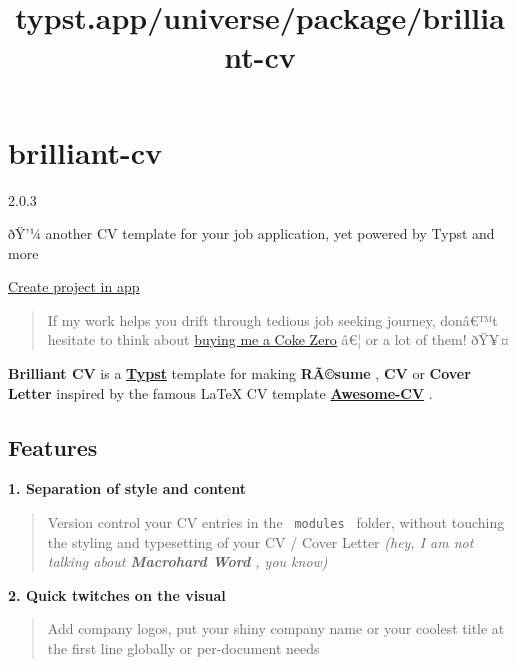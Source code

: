 \title{typst.app/universe/package/brilliant-cv}

\label{banner}
\label{template-thumbnail}

\section{brilliant-cv}\label{brilliant-cv}

{ 2.0.3 }

ðŸ'¼ another CV template for your job application, yet powered by Typst
and more

\href{/app?template=brilliant-cv&version=2.0.3}{Create project in app}

\label{readme}
\hfill\break

\begin{quote}
If my work helps you drift through tedious job seeking journey, donâ€™t
hesitate to think about
\href{https://github.com/sponsors/mintyfrankie}{buying me a Coke Zero}
â€¦ or a lot of them! ðŸ¥¤
\end{quote}

\textbf{Brilliant CV} is a
\href{https://github.com/typst/typst}{\textbf{Typst}} template for
making \textbf{RÃ©sume} , \textbf{CV} or \textbf{Cover Letter} inspired
by the famous LaTeX CV template
\href{https://github.com/posquit0/Awesome-CV}{\textbf{Awesome-CV}} .

\subsection{Features}\label{features}

\textbf{1. Separation of style and content}

\begin{quote}
Version control your CV entries in the \texttt{\ modules\ } folder,
without touching the styling and typesetting of your CV / Cover Letter
\emph{(hey, I am not talking about \textbf{Macrohard Word} , you know)}
\end{quote}

\textbf{2. Quick twitches on the visual}

\begin{quote}
Add company logos, put your shiny company name or your coolest title at
the first line globally or per-document needs
\end{quote}

